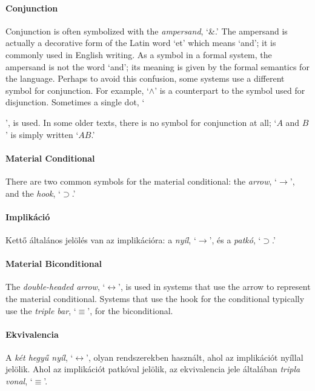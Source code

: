 \paragraph{Conjunction}
Conjunction is often symbolized with the \emph{ampersand}, `{\&}.' The ampersand is actually a decorative form of the Latin word `et' which means `and'; it is commonly used in English writing. As a symbol in a formal system, the ampersand is not the word `and'; its meaning is given by the formal semantics for the language. Perhaps to avoid this confusion, some systems use a different symbol for conjunction. For example, `$\wedge$' is a counterpart to the symbol used for disjunction. Sometimes a single dot, `\begin{scriptsize}\textbullet\end{scriptsize}', is used. In some older texts, there is no symbol for conjunction at all; `$A$ and $B$' is simply written `$AB$.'



\paragraph{Material Conditional} There are two common symbols for the material conditional: the \emph{arrow}, `$\rightarrow$', and the \emph{hook}, `$\supset$.'

\paragraph{Implikáció} Kettő általános jelölés van az implikációra: a \emph{nyíl}, `$\rightarrow$', és a \emph{patkó}, `$\supset$.'

\paragraph{Material Biconditional} The \emph{double-headed arrow}, `$\leftrightarrow$', is used in systems that use the arrow to represent the material conditional. Systems that use the hook for the conditional typically use the \emph{triple bar}, `$\equiv$', for the biconditional.

\paragraph{Ekvivalencia} A \emph{két hegyű nyíl}, `$\leftrightarrow$', olyan rendszerekben használt, ahol az implikációt nyíllal jelölik. Ahol az implikációt patkóval jelölik, az ekvivalencia jele általában \emph{tripla vonal}, `$\equiv$'.

